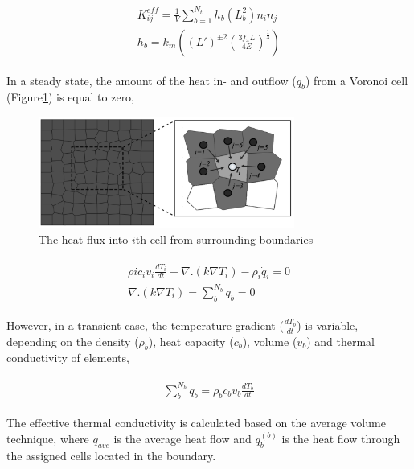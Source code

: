 \begin{align}
\label{eq:LEM_Thermal_1}
\begin{split}  
K_{ij}^{eff}=\frac{1}{V}\sum_{b=1}^{N_t}{h_b(L_b^2)n_i n_j}
\\
h_b = k_m \left( (L')^{\pm2} \left(\frac{3f_xL}{4E}\right)^\frac{1}{3} \right)
\end{split}
\end{align}        

In a steady state, the amount of the heat in- and outflow ($q_b$) from a Voronoi cell (Figure\ref{fig:Amir_LEM_Thermal}) is equal to zero,

\begin{figure}[!ht]
\centering
\includegraphics[width=0.75\textwidth]{figures/Amir_LEM_Thermal.png}
\caption{The heat flux into $i$th cell from surrounding boundaries}
\label{fig:Amir_LEM_Thermal}
\end{figure}

\begin{align}
\label{eq:LEM_Thermal_2}
\begin{split}  
\rho ic_iv_i\frac{dT_i}{dt}-\nabla .\left(k\nabla T_i\right)-\rho_i{\dot{q}}_i=0\\
\nabla .\left(k\nabla T_i\right)=\sum_{b}^{N_b}{q_b=0}
\end{split}
\end{align}     
 
However, in a transient case, the temperature gradient ($\frac{dT_b}{dt}$) is variable, depending on the density ($\rho_b$), heat capacity ($c_b$), volume ($v_b$) and thermal conductivity of elements,

\begin{align}
\label{eq:LEM_Thermal_3}
\begin{split}  
\sum_{b}^{N_b}{q_b=}\rho_bc_bv_b\frac{dT_b}{dt}
\end{split}
\end{align}     

The effective thermal conductivity is calculated based on the average volume technique, where $q_{ave}$ is the average heat flow and $q_b^{(b)}$ is the heat flow through the assigned cells located in the boundary. 

